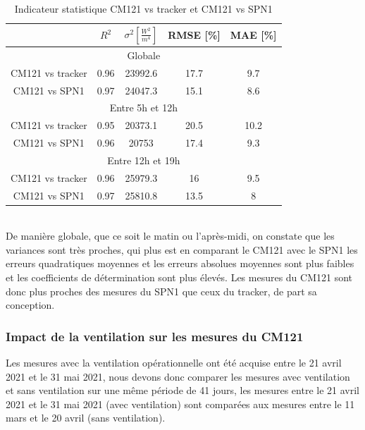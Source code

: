 \documentclass[12pt,a4paper]{article}
\begin{document}
\begin{flushleft}
\begin{table}[H]
\begin{center}
\begin{tabular}{ |c|c|c|c|c| } 
 \hline
  & $R^2$ & $\sigma ^2 [\frac{W^2}{m^4}]$ & RMSE [\%] & MAE [\%] \\ 
  \hline
  \multicolumn{5}{|c|}{Globale} \\
  \hline
 CM121 vs tracker & 0.96 & 23992.6 & 17.7 & 9.7\\ 
 \hline
 CM121 vs SPN1 & 0.97 & 24047.3 & 15.1 & 8.6 \\ 
 \hline
  \multicolumn{5}{|c|}{Entre 5h et 12h} \\
  \hline
   CM121 vs tracker & 0.95 & 20373.1 & 20.5 & 10.2\\ 
 \hline
 CM121 vs SPN1 & 0.96 & 20753 & 17.4 & 9.3 \\
 \hline
  \multicolumn{5}{|c|}{Entre 12h et 19h} \\
  \hline 
   CM121 vs tracker & 0.96 & 25979.3 & 16 & 9.5\\ 
 \hline
 CM121 vs SPN1 & 0.97 & 25810.8 & 13.5 & 8 \\
 \hline
\end{tabular}
\caption{Indicateur statistique CM121 vs tracker et CM121 vs SPN1}
\end{center}
\end{table}

~\\
De manière globale, que ce soit le matin ou l'après-midi, on constate que les variances sont très proches, qui plus est en comparant le CM121 avec le SPN1 les erreurs quadratiques moyennes et les erreurs absolues moyennes sont plus faibles et les coefficients de détermination sont plus élevés. Les mesures du CM121 sont donc plus proches des mesures du SPN1 que ceux du tracker, de part sa conception. \\



\subsubsection{Impact de la ventilation sur les mesures du CM121}

Les mesures avec la ventilation opérationnelle ont été acquise entre le 21 avril 2021 et le 31 mai 2021, nous devons donc comparer les mesures avec ventilation et sans ventilation sur une même période de 41 jours, les mesures entre le 21 avril 2021 et le 31 mai 2021 (avec ventilation) sont comparées aux mesures entre le 11 mars et le 20 avril (sans ventilation).


\end{flushleft}
\end{document}
